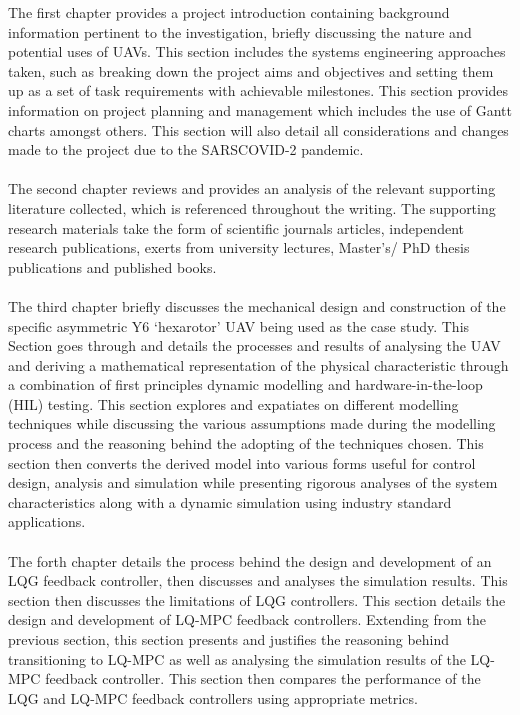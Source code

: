 \documentclass[12pt,a4paper,twoside]{report}
\begin{document}
		The first chapter provides a project introduction containing background information pertinent to the investigation, briefly discussing the nature and potential uses of UAVs. This section includes the systems engineering approaches taken, such as breaking down the project aims and objectives and setting them up as a set of task requirements with achievable milestones. This section provides information on project planning and management which includes the use of Gantt charts amongst others. This section will also detail all considerations and changes made to the project due to the SARSCOVID-2 pandemic.
		\\ \\
		The second chapter reviews and provides an analysis of the relevant supporting literature collected, which is referenced throughout the writing. The supporting research materials take the form of scientific journals articles, independent research publications, exerts from university lectures, Master’s/ PhD thesis publications and published books.
		\\ \\
		The third chapter briefly discusses the mechanical design and construction of the specific asymmetric Y6 ‘hexarotor’ UAV being used as the case study. This Section goes through and details the processes and results of analysing the UAV and deriving a mathematical representation of the physical characteristic through a combination of first principles dynamic modelling and hardware-in-the-loop (HIL) testing. This section explores and expatiates on different modelling techniques while discussing the various assumptions made during the modelling process and the reasoning behind the adopting of the techniques chosen. This section then converts the derived model into various forms useful for control design, analysis and simulation while presenting rigorous analyses of the system characteristics along with a dynamic simulation using industry standard applications.
		\\ \\
		The forth chapter details the process behind the design and development of an LQG feedback controller, then discusses and analyses the simulation results. This section then discusses the limitations of LQG controllers. This section details the design and development of LQ-MPC feedback controllers. Extending from the previous section, this section presents and justifies the reasoning behind transitioning to LQ-MPC as well as analysing the simulation results of the LQ-MPC feedback controller. This section then compares the performance of the LQG and LQ-MPC feedback controllers using appropriate metrics.
\end{document}
